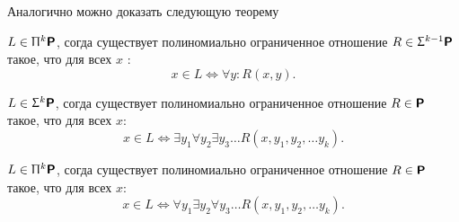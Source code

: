 Аналогично можно доказать следующую теорему
\begin{thm}
	$ L \in \PI^{k}\P$, согда существует полиномиально ограниченное отношение $ R \in \SIGMA^{k-1}\P$ такое, что для всех $ x$ :
	\[
		x \in L \Longleftrightarrow \forall  y \colon R(x, y)
	.\] 
\end{thm}
\begin{cor}\label{cor:polysigkpi}
    $ L \in \SIGMA^{k}\P$, согда существует полиномиально ограниченное отношение $ R \in \P$ такое, что для всех $ x$:
	\[
		x \in L \Longleftrightarrow \exists y_1 \forall y_2 \exists y_3 \ldots R(x, y_1, y_2, \ldots y_k)
	.\] 
\end{cor}
\begin{cor}
    $ L \in \PI^{k}\P$, согда существует полиномиально ограниченное отношение $ R \in \P$ такое, что для всех $ x$:
	\[
		x \in L \Longleftrightarrow \forall y_1 \exists  y_2 \forall  y_3 \ldots R(x, y_1, y_2, \ldots y_k)
	.\] 
\end{cor}

